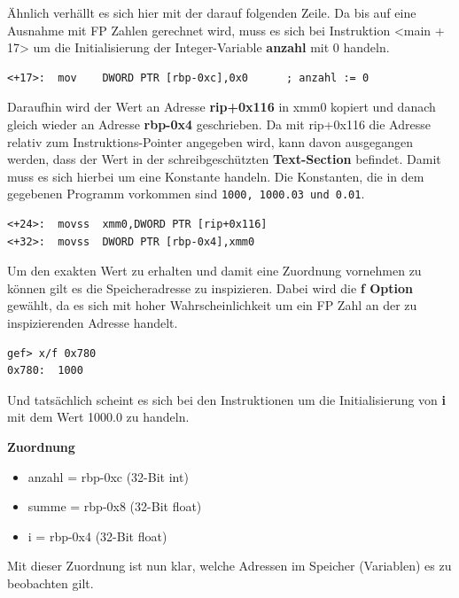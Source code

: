 \documentclass[12pt]{article}
\begin{document}
Ähnlich verhällt es sich hier mit der darauf folgenden Zeile. Da bis auf eine Ausnahme mit FP Zahlen gerechnet wird, muss es sich bei Instruktion <main + 17> um die Initialisierung der Integer-Variable \textbf{anzahl} mit 0 handeln.
\begin{lstlisting}
<+17>:	mov    DWORD PTR [rbp-0xc],0x0		; anzahl := 0
\end{lstlisting}

Daraufhin wird der Wert an Adresse \textbf{rip+0x116} in xmm0 kopiert und danach gleich wieder an Adresse \textbf{rbp-0x4} geschrieben. Da mit rip+0x116 die Adresse relativ zum Instruktions-Pointer angegeben wird, kann davon ausgegangen werden, dass der Wert in der schreibgeschützten \textbf{Text-Section} befindet. Damit muss es sich hierbei um eine Konstante handeln. Die Konstanten, die in dem gegebenen Programm vorkommen sind \texttt{1000, 1000.03 und 0.01}.
\begin{lstlisting}
<+24>:	movss  xmm0,DWORD PTR [rip+0x116]
<+32>:	movss  DWORD PTR [rbp-0x4],xmm0
\end{lstlisting}
Um den exakten Wert zu erhalten und damit eine Zuordnung vornehmen zu können gilt es die Speicheradresse zu inspizieren. Dabei wird die \textbf{f Option} gewählt, da es sich mit hoher Wahrscheinlichkeit um ein FP Zahl an der zu inspizierenden Adresse handelt.
\begin{lstlisting}
gef> x/f 0x780
0x780:	1000
\end{lstlisting}
Und tatsächlich scheint es sich bei den Instruktionen um die Initialisierung von \textbf{i} mit dem Wert 1000.0 zu handeln.

\textbf{Zuordnung}
\begin{itemize}
	\item anzahl = rbp-0xc	(32-Bit int)
	\item summe  = rbp-0x8	(32-Bit float)
	\item i	     = rbp-0x4	(32-Bit float)
\end{itemize}

Mit dieser Zuordnung ist nun klar, welche Adressen im Speicher (Variablen) es zu beobachten gilt.
\end{document}
